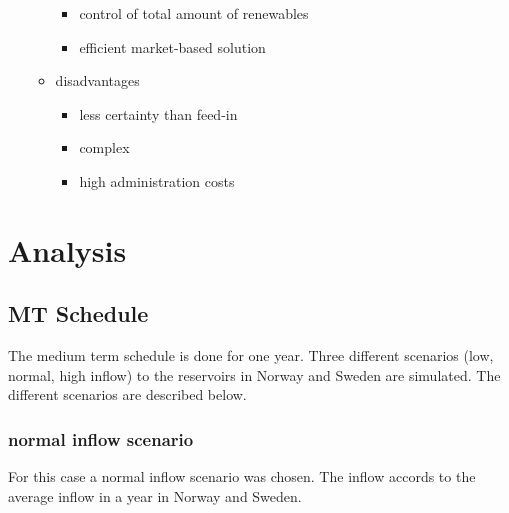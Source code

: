 \documentclass{article}
\begin{document}
\begin{itemize}
\begin{itemize}
\begin{itemize}
\item control of total amount of renewables
\item efficient market-based solution
\end{itemize}
\item disadvantages
\begin{itemize}
\item less certainty than feed-in
\item complex
\item high administration costs
\end{itemize}
\end{itemize}
\end{itemize}

\section{Analysis}

\subsection{MT Schedule}
The medium term schedule is done for one year. Three different scenarios (low, normal, high inflow) to the reservoirs in Norway and Sweden are simulated. The different scenarios are described below.

\subsubsection{normal inflow scenario}
For this case a normal inflow scenario was chosen. The inflow accords to the average inflow in a year in Norway and Sweden.
\end{document}
